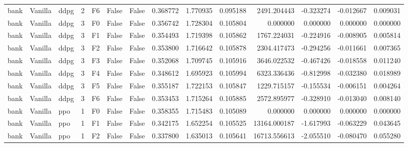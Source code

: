 \begin{tabular}{lllrlllrrrrrrr}
      bank & Vanilla &      ddpg &     2 &  F6 &           False &            False &  0.368772 &  1.770935 & 0.095188 &      2491.204443 &          -0.323274 &       -0.012667 &            0.009031 \\
      bank & Vanilla &      ddpg &     3 &  F0 &           False &            False &  0.356742 &  1.728304 & 0.105804 &         0.000000 &           0.000000 &        0.000000 &            0.000000 \\
      bank & Vanilla &      ddpg &     3 &  F1 &           False &            False &  0.354493 &  1.719398 & 0.105862 &      1767.224031 &          -0.224916 &       -0.008905 &            0.005814 \\
      bank & Vanilla &      ddpg &     3 &  F2 &           False &            False &  0.353800 &  1.716642 & 0.105878 &      2304.417473 &          -0.294256 &       -0.011661 &            0.007365 \\
      bank & Vanilla &      ddpg &     3 &  F3 &           False &            False &  0.352068 &  1.709745 & 0.105916 &      3646.022532 &          -0.467426 &       -0.018558 &            0.011240 \\
      bank & Vanilla &      ddpg &     3 &  F4 &           False &            False &  0.348612 &  1.695923 & 0.105994 &      6323.336436 &          -0.812998 &       -0.032380 &            0.018989 \\
      bank & Vanilla &      ddpg &     3 &  F5 &           False &            False &  0.355187 &  1.722153 & 0.105847 &      1229.715157 &          -0.155534 &       -0.006151 &            0.004264 \\
      bank & Vanilla &      ddpg &     3 &  F6 &           False &            False &  0.353453 &  1.715264 & 0.105885 &      2572.895977 &          -0.328910 &       -0.013040 &            0.008140 \\
      bank & Vanilla &       ppo &     1 &  F0 &           False &            False &  0.358355 &  1.715483 & 0.105089 &         0.000000 &           0.000000 &        0.000000 &            0.000000 \\
      bank & Vanilla &       ppo &     1 &  F1 &           False &            False &  0.342175 &  1.652254 & 0.105525 &     13164.000187 &          -1.617993 &       -0.063229 &            0.043645 \\
      bank & Vanilla &       ppo &     1 &  F2 &           False &            False &  0.337800 &  1.635013 & 0.105641 &     16713.556613 &          -2.055510 &       -0.080470 &            0.055280 \\

\end{tabular}
